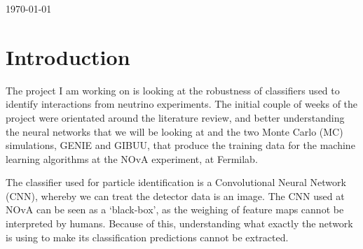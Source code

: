 \documentclass[11pt]{article}
\begin{document}
\begin{titlepage}
	
	
	\vfill\vfill\vfill %
	
	{\large\today} %
	
	
	 	
\end{titlepage}

\newenvironment{scilastnote}{%
\setcounter{lastnote}{\value{enumiv}}%
\addtocounter{lastnote}{+1}%
\begin{list}%
{\arabic{lastnote}.}
{\setlength{\leftmargin}{.22in}}
{\setlength{\labelsep}{.5em}}}
{\end{list}}

\section*{Introduction}

The project I am working on is looking at the robustness of classifiers used to identify interactions from neutrino experiments. The initial couple of weeks of the project were orientated around the literature review, and better understanding the neural networks that we will be looking at and the two Monte Carlo (MC) simulations, GENIE and GIBUU, that produce the training data for the machine learning algorithms at the NOvA experiment, at Fermilab. 

The classifier used for particle identification is a Convolutional Neural Network (CNN), whereby we can treat the detector data is an image. The CNN used at NOvA can be seen as a ‘black-box’, as the weighing of feature maps cannot be interpreted by humans. Because of this, understanding what exactly the network is using to make its classification predictions cannot be extracted.
\end{document}

